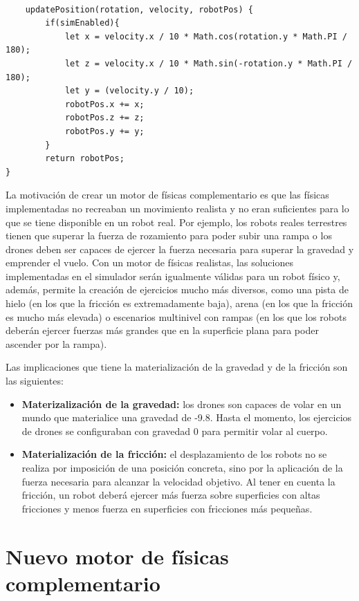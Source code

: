 \small{
\begin{verbatim} 

    updatePosition(rotation, velocity, robotPos) {
        if(simEnabled){
            let x = velocity.x / 10 * Math.cos(rotation.y * Math.PI / 180);
            let z = velocity.x / 10 * Math.sin(-rotation.y * Math.PI / 180);
            let y = (velocity.y / 10);
            robotPos.x += x;
            robotPos.z += z;
            robotPos.y += y;
        }
        return robotPos;
}
\end{verbatim}
}

\normalsize
La motivación de crear un motor de físicas complementario es que las físicas implementadas no recreaban un movimiento realista y no eran suficientes para lo que se tiene disponible en un robot real. Por ejemplo, los robots reales terrestres tienen que superar la fuerza de rozamiento para poder subir una rampa o los drones deben ser capaces de ejercer la fuerza necesaria para superar la gravedad y emprender el vuelo. Con un motor de físicas realistas, las soluciones implementadas en el simulador serán igualmente válidas para un robot físico y, además, permite la creación de ejercicios mucho más diversos, como una pista de hielo (en los que la fricción es extremadamente baja), arena (en los que la fricción es mucho más elevada) o escenarios multinivel con rampas (en los que los robots deberán ejercer fuerzas más grandes que en la superficie plana para poder ascender por la rampa). \newline

Las implicaciones que tiene la materialización de la gravedad y de la fricción son las siguientes:

\begin{itemize}
    \item \textbf{Materizalización de la gravedad:} los drones son capaces de volar en un mundo que materialice una gravedad de -9.8. Hasta el momento, los ejercicios de drones se configuraban con gravedad 0 para permitir volar al cuerpo.
    \item \textbf{Materialización de la fricción:} el desplazamiento de los robots no se realiza por imposición de una posición concreta, sino por la aplicación de la fuerza necesaria para alcanzar la velocidad objetivo. Al tener en cuenta la fricción, un robot deberá ejercer más fuerza sobre superficies con altas fricciones y menos fuerza en superficies con fricciones más pequeñas.
\end{itemize}

\clearpage
\section{Nuevo motor de físicas complementario}
